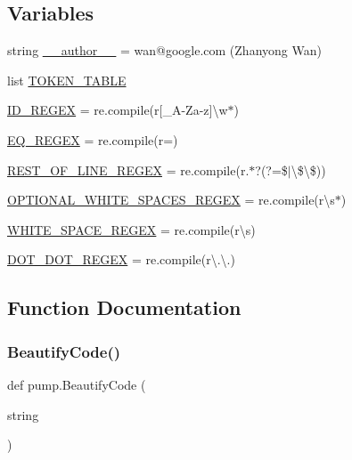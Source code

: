 \subsection*{Variables}
\begin{DoxyCompactItemize}
\item 
string \hyperlink{namespacepump_ab99a065546038823261c774117df0798}{\+\_\+\+\_\+author\+\_\+\+\_\+} = \textquotesingle{}wan@google.\+com (Zhanyong Wan)\textquotesingle{}
\item 
list \hyperlink{namespacepump_a132b35d1104c7f479aa21c345f413477}{T\+O\+K\+E\+N\+\_\+\+T\+A\+B\+LE}
\item 
\hyperlink{namespacepump_a8e008923b6c378b8d3df611fb07d6dda}{I\+D\+\_\+\+R\+E\+G\+EX} = re.\+compile(r\textquotesingle{}\mbox{[}\+\_\+A-\/Za-\/z\mbox{]}\textbackslash{}w$\ast$\textquotesingle{})
\item 
\hyperlink{namespacepump_a6397ed9bab62b5c6f60a6626f6b287e0}{E\+Q\+\_\+\+R\+E\+G\+EX} = re.\+compile(r\textquotesingle{}=\textquotesingle{})
\item 
\hyperlink{namespacepump_a4c1f68b32fcb8366051b574cf2e6aef1}{R\+E\+S\+T\+\_\+\+O\+F\+\_\+\+L\+I\+N\+E\+\_\+\+R\+E\+G\+EX} = re.\+compile(r\textquotesingle{}.$\ast$?(?=\$$\vert$\textbackslash{}\$\textbackslash{}\$)\textquotesingle{})
\item 
\hyperlink{namespacepump_a81f03eaffd2c0f4c6a453a0b179e51ca}{O\+P\+T\+I\+O\+N\+A\+L\+\_\+\+W\+H\+I\+T\+E\+\_\+\+S\+P\+A\+C\+E\+S\+\_\+\+R\+E\+G\+EX} = re.\+compile(r\textquotesingle{}\textbackslash{}s$\ast$\textquotesingle{})
\item 
\hyperlink{namespacepump_a4ab1be351870f785a72d324bf56c8316}{W\+H\+I\+T\+E\+\_\+\+S\+P\+A\+C\+E\+\_\+\+R\+E\+G\+EX} = re.\+compile(r\textquotesingle{}\textbackslash{}s\textquotesingle{})
\item 
\hyperlink{namespacepump_a45644ad738e584ec754f6d9f45fe693c}{D\+O\+T\+\_\+\+D\+O\+T\+\_\+\+R\+E\+G\+EX} = re.\+compile(r\textquotesingle{}\textbackslash{}.\textbackslash{}.\textquotesingle{})
\end{DoxyCompactItemize}


\subsection{Function Documentation}
\mbox{\label{namespacepump_a3456db8d85605892d670669c4e238cd7}} 
\subsubsection{\texorpdfstring{Beautify\+Code()}{BeautifyCode()}}
{\footnotesize\ttfamily def pump.\+Beautify\+Code (\begin{DoxyParamCaption}\item[{}]{string }\end{DoxyParamCaption})}



